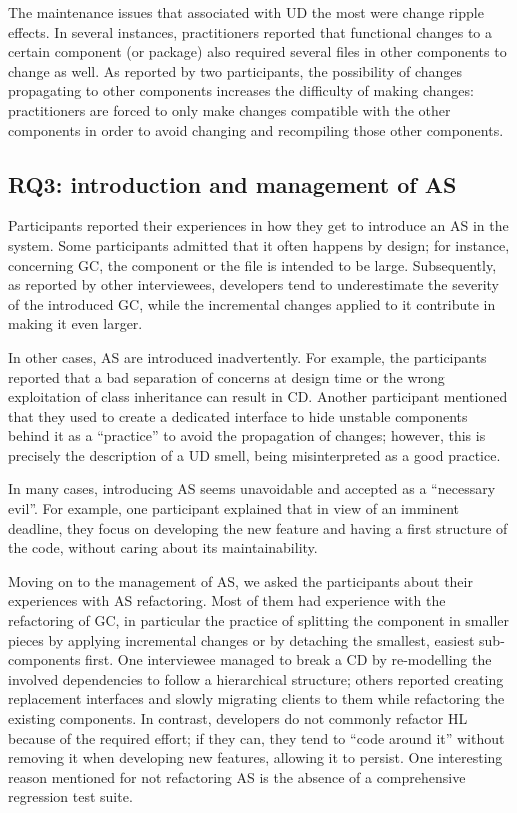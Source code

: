 The maintenance issues that associated with UD the most were change ripple effects. In several instances, practitioners reported that functional changes to a certain component (or package) also required several files in other components to change as well. As reported by two participants, the possibility of changes propagating to other components increases the difficulty of making changes: practitioners are forced to only make changes compatible with the other components in order to avoid changing and recompiling those other components.

\subsection{RQ3: introduction and management of AS}
Participants reported their experiences in how they get to introduce an AS in the system. Some participants admitted that it often happens by design; for instance, concerning GC, the component or the file is intended to be large. Subsequently, as reported by other interviewees, developers tend to underestimate the severity of the introduced GC, while the incremental changes applied to it contribute in making it even larger. 

In other cases, AS are introduced inadvertently. For example, the participants reported that a bad separation of concerns at design time or the wrong exploitation of class inheritance can result in CD. Another participant mentioned that they used to create a dedicated interface to hide unstable components behind it as a “practice” to avoid the propagation of changes; however, this is precisely the description of a UD smell, being misinterpreted as a good practice.

In many cases, introducing AS seems unavoidable and accepted as a “necessary evil”. For example, one participant explained that in view of an imminent deadline, they focus on developing the new feature and having a first structure of the code, without caring about its maintainability. 

Moving on to the management of AS, we asked the participants about their experiences with AS refactoring. Most of them had experience with the refactoring of GC, in particular the practice of splitting the component in smaller pieces by applying incremental changes or by detaching the smallest, easiest sub-components first. One interviewee managed to break a CD by re-modelling the involved dependencies to follow a hierarchical structure; others reported creating replacement interfaces and slowly migrating clients to them while refactoring the existing components. In contrast, developers do not commonly refactor HL because of the required effort; if they can, they tend to “code around it” without removing it when developing new features, allowing it to persist. One interesting reason mentioned for not refactoring AS is the absence of a comprehensive regression test suite.

